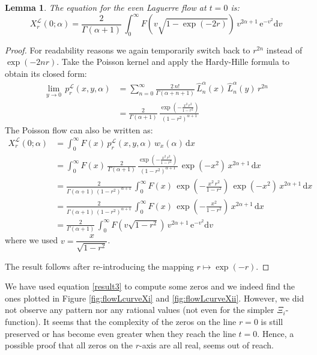 \documentclass[a4paper,11pt,twoside]{amsart}
\newtheorem{lemma}[theorem]{Lemma}
\newcommand{\verifiedeq}{=}
\newcommand{\verifiedeq}{\stackrel{\checkmark}{=}}
\begin{document}
\begin{lemma}
The equation for the even Laguerre flow at $t=0$ is:
\begin{equation}
X^{\mathcal{L}}_r\left(0;\alpha\right) =  \frac{2}{\Gamma(\alpha+1)}\,\int_0^\infty F\left(v\sqrt{1-\exp(-2r)}\right)\,v^{2\alpha+1}\,\mathrm{e}^{-v^2}\mathrm{d}v
\end{equation} 
\end{lemma}
\begin{proof}
For readability reasons we again temporarily switch back to $r^{2n}$ instead of $\exp(-2nr)$. Take the Poisson kernel and apply the Hardy-Hille formula to obtain its closed form:
\begin{align}
  \lim_{y\to 0} \,p^\mathcal{L}_r(x,y,\alpha) &= \sum_{n=0}^\infty \frac{2\,n!}{\Gamma(\alpha+n+1)}\,\hat{L}^{\alpha}_n(x)\,\hat{L}^{\alpha}_n(y)\,r^{2n} \\
  &=\frac{2}{\Gamma(\alpha+1)}\,\frac{\exp\left(-\frac{x^2\,r^2}{1-r^2}\right)}{\left(1-r^2\right)^{\alpha+1}}
\end{align}
The Poisson flow can also be written as: 
\begin{align}
X^{\mathcal{L}}_r(0;\alpha) &\verifiedeq \int_0^\infty F(x)\,p^\mathcal{L}_r(x,y,\alpha)\,w_x(\alpha) \,\mathrm{d} x \\
&\verifiedeq \int_0^\infty F(x)\,\frac{2}{\Gamma(\alpha+1)}\,\frac{\exp\left(-\frac{x^2\,r^2}{1-r^2}\right)}{\left(1-r^2\right)^{\alpha+1}}\,\exp(-x^2)\,x^{2\alpha+1} \,\mathrm{d} x \\
&\verifiedeq \frac{2}{\Gamma(\alpha+1)\,\left(1-r^2\right)^{\alpha+1}}\,\int_0^\infty F(x)\,\exp\left(-\frac{x^2\,r^2}{1-r^2}\right)\,\exp(-x^2)\,x^{2\alpha+1} \,\mathrm{d} x \\
&\verifiedeq \frac{2}{\Gamma(\alpha+1)\,\left(1-r^2\right)^{\alpha+1}}\,\int_0^\infty F(x)\,\exp\left(-\frac{x^2}{1-r^2}\right)\,x^{2\alpha+1} \,\mathrm{d} x \\
&\verifiedeq \frac{2}{\Gamma(\alpha+1)}\,\int_0^\infty F\left(v\sqrt{1-r^2}\right)\,v^{2\alpha+1}\,\mathrm{e}^{-v^2}\mathrm{d}v \label{result3}
\end{align}
where we used $v = \dfrac{x}{\sqrt{1-r^2}}$. 

The result follows after re-introducing the mapping $r \mapsto \exp(-r)$.
\end{proof}

We have used equation \ref{result3} to compute some zeros and we indeed find the ones plotted in Figure \ref{fig:flowLcurveXi} and \ref{fig:flowLcurveXii}. However, we did not observe any pattern nor any rational values (not even for the simpler $\Xi_i$-function). It seems that the complexity of the zeros on the line $r=0$ is still preserved or has become even greater when they reach the line $t=0$. Hence, a possible proof that all zeros on the $r$-axis are all real, seems out of reach.   
\end{document}
